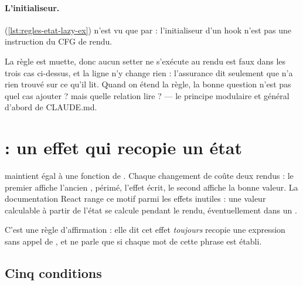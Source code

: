 \paragraph{L'initialiseur.}  (\cref{lst:regles-etat-lazy-ex}) n'est vu que par  : l'initialiseur d'un hook n'est pas une instruction du CFG de rendu.

\begin{piege}
\og La règle est muette, donc aucun setter ne s'exécute au rendu\fg{} est faux dans les trois cas ci-dessus, et la ligne  n'y change rien : l'assurance dit seulement que  n'a rien trouvé sur ce qu'il lit. Quand on étend la règle, la bonne question n'est pas \og quel cas ajouter ?\fg{} mais \og quelle relation lire ?\fg{} --- le principe \og modulaire et général d'abord\fg{} de CLAUDE.md.
\end{piege}

\section{ : un effet qui recopie un état}
\label{sec:regles-etat-derived}

\begin{react}
 maintient  égal à une fonction de . Chaque changement de  coûte deux rendus : le premier affiche l'ancien , périmé, l'effet écrit, le second affiche la bonne valeur. La documentation React range ce motif parmi les effets inutiles : une valeur calculable à partir de l'état se calcule pendant le rendu, éventuellement dans un  \cite{ReactDocs}.
\end{react}

C'est une règle d'affirmation : elle dit \og cet effet \emph{toujours} recopie une expression sans appel de \fg, et ne parle que si chaque mot de cette phrase est établi.

\subsection{Cinq conditions}


